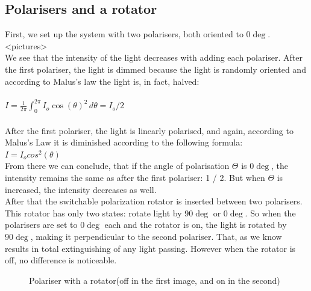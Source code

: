\documentclass[english]{article}
\begin{document}
\subsection{Polarisers and a rotator}
First, we set up the system with two polarisers, both oriented to $0\deg$. <pictures>\\
We see that the intensity of the light decreases with adding each polariser. After the first polariser, the light is dimmed because the light is randomly oriented and according to Malus's law the light is, in fact, halved:\\
\\
$I=\frac{1}{2\pi}\int_0^{2\pi}I_{o}\cos(\theta)^2\,d\theta=I_{o}/2$\\
\\
After the first polariser, the light is linearly polarised, and again, according to Malus's Law it is diminished according to the following formula:\\
$I=I_ocos^2(θ)$\\
From there we can conclude, that if the angle of polarisation $\Theta$ is $0\deg$, the intensity remains the same as after the first polariser: 1 / 2. But when $\Theta$ is increased, the intensity decreases as well.\\
After that the switchable polarization rotator is inserted between two polarisers. This rotator has only two states: rotate light by $90\deg$ or $0\deg$. So when the polarisers are set to $0\deg$ each and the rotator is on, the light is rotated by $90\deg$, making it perpendicular to the second polariser. That, as we know results in total extinguishing of any light passing. However when the rotator is off, no difference is noticeable.\\
\begin{figure}[H]
	\centering
	\caption{Polariser with a rotator(off in the first image, and on in the second)}
	\label{fig:one}
\end{figure}
\end{document}
